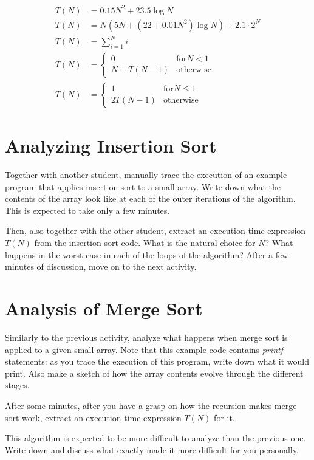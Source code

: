 \documentclass[a4paper]{article}
\begin{document}
\begin{align}
  T(N) &= 0.15 N^2 + 23.5 \log N
  \\
  T(N) &= N (5N + (22 + 0.01N^2) \log N) + 2.1 \cdot 2^N
  \\
  T(N) &= \sum_{i=1}^Ni
  \\
  T(N) &=
  \begin{cases}
    0          & \text{for} N < 1 \\
    N + T(N-1) & \text{otherwise}
  \end{cases}
  \\
  T(N) &=
  \begin{cases}
    1        & \text{for} N \leq 1 \\
    2 T(N-1) & \text{otherwise}
  \end{cases}
\end{align}



\section{Analyzing Insertion Sort}

Together with another student, manually trace the execution of an example program that applies insertion sort to a small array.
Write down what the contents of the array look like at each of the outer iterations of the algorithm.
This is expected to take only a few minutes.

Then, also together with the other student, extract an execution time expression $T(N)$ from the insertion sort code.
What is the natural choice for $N$?
What happens in the worst case in each of the loops of the algorithm?
After a few minutes of discussion, move on to the next activity.



\section{Analysis of Merge Sort}

Similarly to the previous activity, analyze what happens when merge sort is applied to a given small array.
Note that this example code contains \emph{printf} statements: as you trace the execution of this program, write down what it would print.
Also make a sketch of how the array contents evolve through the different stages.

After some minutes, after you have a grasp on how the recursion makes merge sort work, extract an execution time expression $T(N)$ for it.

This algorithm is expected to be more difficult to analyze than the previous one.
Write down and discuss what exactly made it more difficult for you personally.
\end{document}
